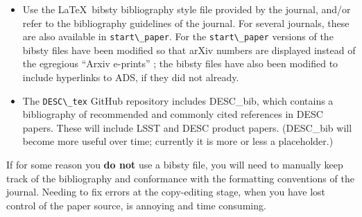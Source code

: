 \documentclass[letterpaper,11pt]{article}
\begin{document}
\begin{itemize}

\item
Use the La\TeX~bibsty bibliography style file provided by the journal, and/or refer to the bibliography guidelines of the journal.  For several journals, these are also available in \verb|start\_paper|.  For  the \verb|start\_paper| versions of the bibsty files have been modified so that arXiv numbers are displayed instead of the egregious ``Arxiv e-prints'' ; the bibsty files have also been  modified to include hyperlinks to ADS, if they did not already.  

\item
The   \verb|DESC\_tex| GitHub repository includes DESC\_bib, which contains a bibliography of recommended and commonly cited references in DESC papers.  These will include LSST and DESC product papers.  (DESC\_bib will become more useful over time; currently it is more or less a placeholder.)

\end{itemize}

If for some reason you {\bf do not} use a bibsty file, you will need to manually keep track of the bibliography and conformance with the formatting conventions of the journal.  Needing to fix errors at the copy-editing stage, when you have lost control of the paper source, is annoying and time consuming.

%
\end{document}
